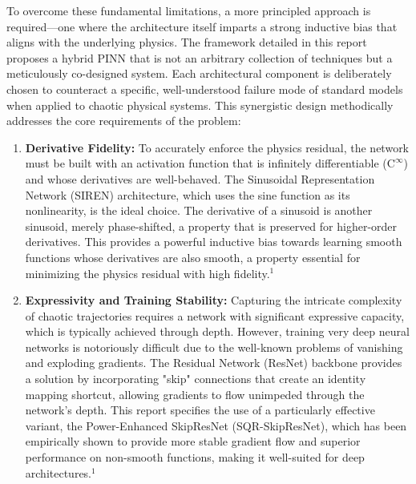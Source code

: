 \documentclass{article}
\begin{document}
To overcome these fundamental limitations, a more principled approach is required—one where the architecture itself imparts a strong inductive bias that aligns with the underlying physics. The framework detailed in this report proposes a hybrid PINN that is not an arbitrary collection of techniques but a meticulously co-designed system. Each architectural component is deliberately chosen to counteract a specific, well-understood failure mode of standard models when applied to chaotic physical systems. This synergistic design methodically addresses the core requirements of the problem:

\begin{enumerate}
    \item \textbf{Derivative Fidelity:} To accurately enforce the physics residual, the network must be built with an activation function that is infinitely differentiable ($\mathrm{C}^\infty$) and whose derivatives are well-behaved. The Sinusoidal Representation Network (SIREN) architecture, which uses the sine function as its nonlinearity, is the ideal choice. The derivative of a sinusoid is another sinusoid, merely phase-shifted, a property that is preserved for higher-order derivatives. This provides a powerful inductive bias towards learning smooth functions whose derivatives are also smooth, a property essential for minimizing the physics residual with high fidelity.$^1$
    \item \textbf{Expressivity and Training Stability:} Capturing the intricate complexity of chaotic trajectories requires a network with significant expressive capacity, which is typically achieved through depth. However, training very deep neural networks is notoriously difficult due to the well-known problems of vanishing and exploding gradients. The Residual Network (ResNet) backbone provides a solution by incorporating "skip" connections that create an identity mapping shortcut, allowing gradients to flow unimpeded through the network's depth. This report specifies the use of a particularly effective variant, the Power-Enhanced SkipResNet (SQR-SkipResNet), which has been empirically shown to provide more stable gradient flow and superior performance on non-smooth functions, making it well-suited for deep architectures.$^1$

\end{enumerate}
\end{document}
